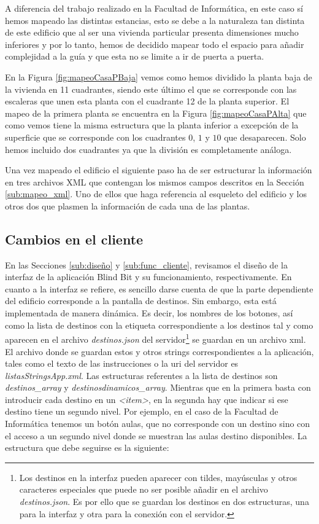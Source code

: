 A diferencia del trabajo realizado en la Facultad de Informática, en este caso sí hemos mapeado las distintas estancias, esto se debe a la naturaleza tan distinta de este edificio que al ser una vivienda particular presenta dimensiones mucho inferiores y por lo tanto, hemos de decidido mapear todo el espacio para añadir complejidad a la guía y que esta no se limite a ir de puerta a puerta.

En la Figura \ref{fig:mapeoCasaPBaja} vemos como hemos dividido la planta baja de la vivienda en 11 cuadrantes, siendo este último el que se corresponde con las escaleras que unen esta planta con el cuadrante 12 de la planta superior. El mapeo de la primera planta se encuentra en la Figura \ref{fig:mapeoCasaPAlta} que como vemos tiene la misma estructura que la planta inferior a excepción de la superficie que se corresponde con los cuadrantes $0$, $1$ y $10$ que desaparecen. Solo hemos incluido dos cuadrantes ya que la división es completamente análoga.

Una vez mapeado el edificio el siguiente paso ha de ser estructurar la información en tres archivos XML que contengan los mismos campos descritos en la Sección \ref{sub:mapeo_xml}. Uno de ellos que haga referencia al esqueleto del edificio y los otros dos que plasmen la información de cada una de las plantas. %



\subsection{Cambios en el cliente}
\label{sub:cambiosCliente_vivienda}

En las Secciones \ref{sub:diseño} y \ref{sub:func_cliente}, revisamos el diseño de la interfaz de la aplicación Blind Bit y su funcionamiento, respectivamente. En cuanto a la interfaz se refiere, es sencillo darse cuenta de que la parte dependiente del edificio corresponde a la pantalla de destinos. Sin embargo, esta está implementada de manera dinámica. Es decir, los nombres de los botones, así como la lista de destinos con la etiqueta correspondiente a los destinos tal y como aparecen en el archivo \textit{destinos.json} del servidor\footnote{Los destinos en la interfaz pueden aparecer con tildes, mayúsculas y otros caracteres especiales que puede no ser posible añadir en el archivo \textit{destinos.json}. Es por ello que se guardan los destinos en dos estructuras, una para la interfaz y otra para la conexión con el servidor.} se guardan en un archivo xml. El archivo donde se guardan estos y otros strings correspondientes a la aplicación, tales como el texto de las instrucciones o la uri del servidor es \textit{listasStringsApp.xml}. Las estructuras referentes a la lista de destinos son \textit{destinos\_array} y \textit{destinosdinamicos\_array}. Mientras que en la primera basta con introducir cada destino en un \textit{<item>}, en la segunda hay que indicar si ese destino tiene un segundo nivel. Por ejemplo, en el caso de la Facultad de Informática tenemos un botón aulas, que no corresponde con un destino sino con el acceso a un segundo nivel donde se muestran las aulas destino disponibles. La estructura que debe seguirse es la siguiente: 


